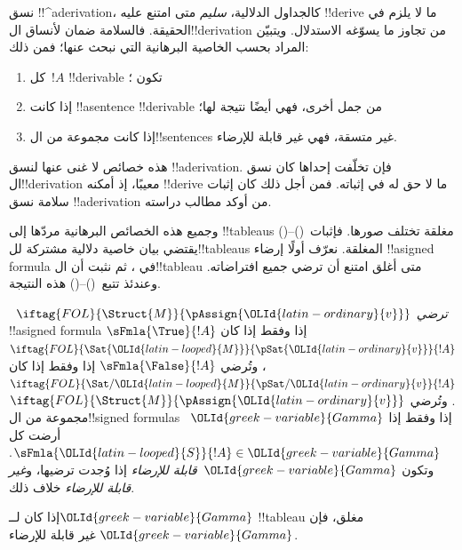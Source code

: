 \documentclass[../../../include/open-logic-section]{subfiles}
\begin{document}
      {}
      {}
      

\begin{explain}
نسق !!^a{derivation}، كالجداول الدلالية، \emph{سليم} متى امتنع عليه
!!{derive} ما لا يلزم في الحقيقة. فالسلامة ضمان لأنساق ال!!{derivation}
من تجاوز ما يسوّغه الاستدلال. ويتبيّن المراد بحسب الخاصية البرهانية
التي نبحث عنها؛ فمن ذلك:
\begin{enumerate}
\item كل~$!A$ !!{derivable} تكون ؛
\item إذا كانت !!a{sentence} !!{derivable} من جمل أخرى، فهي أيضًا نتيجة لها؛
\item إذا كانت مجموعة من ال!!{sentence}s غير متسقة، فهي غير قابلة للإرضاء.
\end{enumerate}
هذه خصائص لا غنى عنها لنسق !!a{derivation}. فإن تخلّفت إحداها
كان نسق ال!!{derivation} معيبًا، إذ أمكنه !!{derive} ما لا حق له
في إثباته. فمن أجل ذلك كان إثبات سلامة نسق !!a{derivation}
من أوكد مطالب دراسته.

وجميع هذه الخصائص البرهانية مردّها إلى !!{tableau}s مغلقة
تختلف صورها. فإثبات~()--() يقتضي بيان خاصية دلالية مشتركة
لل!!{tableau}s المغلقة. نعرّف أولًا إرضاء
!!a{signed formula} في ، ثم نثبت أن
ال!!{tableau} متى أغلق امتنع أن ترضي 
جميع افتراضاته. وعندئذ تتبع~()--() هذه النتيجة.
\end{explain}

\begin{defn}
~$\iftag{FOL}{\Struct{M}}{\pAssign{\OLId{latin-ordinary}{v}}}$
\emph{ترضي}
!!a{signed formula} $\sFmla{\True}{!A}$ إذا وفقط إذا كان
$\iftag{FOL}{\Sat{\OLId{latin-looped}{M}}}{\pSat{\OLId{latin-ordinary}{v}}}{!A}$، وتُرضي
$\sFmla{\False}{!A}$ إذا وفقط إذا كان
$\iftag{FOL}{\Sat/{\OLId{latin-looped}{M}}}{\pSat/{\OLId{latin-ordinary}{v}}}{!A}$. وتُرضي
$\iftag{FOL}{\Struct{M}}{\pAssign{\OLId{latin-ordinary}{v}}}$ مجموعة من ال!!{signed formula}s
~$\OLId{greek-variable}{Gamma}$ إذا وفقط إذا أرضت كل $\sFmla{\OLId{latin-looped}{S}}{!A} \in \OLId{greek-variable}{Gamma}$. وتكون
$\OLId{greek-variable}{Gamma}$~\emph{قابلة للإرضاء} إذا وُجدت
 ترضيها، و\emph{غير قابلة
للإرضاء} خلاف ذلك.
\end{defn}

\begin{thm}[السلامة]
  إذا كان لــ$\OLId{greek-variable}{Gamma}$ !!{tableau} مغلق، فإن $\OLId{greek-variable}{Gamma}$ غير قابلة للإرضاء.
\end{thm}
\end{document}
